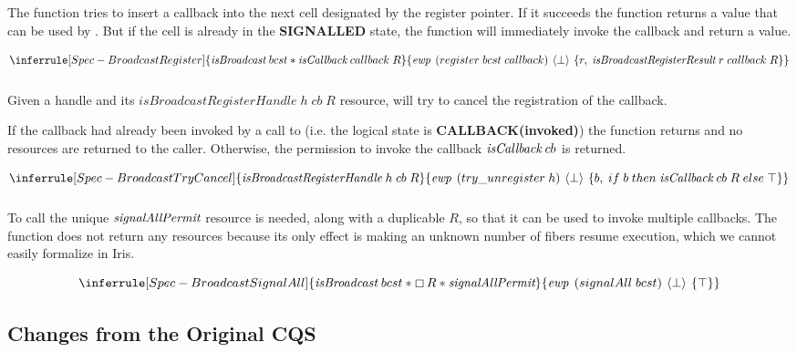 The  function tries to insert a callback into the next cell designated by the register pointer.
If it succeeds the function returns a  value that can be used by .
But if the cell is already in the \textbf{SIGNALLED} state, the function will immediately invoke the callback and return a  value.

\[
  \inferrule[Spec-BroadcastRegister]
  { \gsIsBcst{}\; bcst \ast \gsIsCb{}\; callback\; R }
  { \ewp{register\; bcst\; callback}{\bot}{r,\; \emph{isBroadcastRegisterResult}\; r\; callback\; R}}
\]

\subsubsection{}
\label{sec:broadcast-spec-cance}

Given a handle and its \(\textit{isBroadcastRegisterHandle}\; h\; cb\; R\) resource,  will try to cancel the registration of the callback.

If the callback had already been invoked by a call to  (i.e. the logical state is \textbf{CALLBACK(invoked)}) the function returns  and no resources are returned to the caller.
Otherwise, the permission to invoke the callback \(\emph{isCallback}{}\; cb\) is returned.

\[
  \inferrule[Spec-BroadcastTryCancel]
  { \emph{isBroadcastRegisterHandle}\; h\; cb\; R }
  { \ewp{try\_unregister\; h}{\bot}{b,\; if\; b\; then\; \gsIsCb{}\; cb\; R\; else\; \top}}
\]

\subsubsection{}
\label{sec:broadcast-spec-signal-all}

To call  the unique \(\emph{signalAllPermit}{}\) resource is needed, along with a duplicable \(R\), so that it can be used to invoke multiple callbacks.
The function does not return any resources because its only effect is making an unknown number of fibers resume execution, which we cannot easily formalize in Iris.

\[
  \inferrule[Spec-BroadcastSignalAll]
  { \gsIsBcst{}\; bcst \ast \always R \ast \gssignal{}}
  { \ewp{signalAll\; bcst}{\bot}{\top} }
\]

\subsection{Changes from the Original CQS}
\label{sec:broadcast-spec-removed-features}

